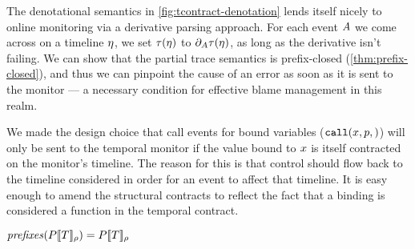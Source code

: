 The denotational semantics in \autoref{fig:tcontract-denotation} lends itself nicely to online monitoring via a derivative parsing approach.
%
For each event $A$ we come across on a timeline $\eta$, we set $\tau(\eta)$ to $\partial_{A}{\tau(\eta)}$, as long as the derivative isn't failing.
%
We can show that the partial trace semantics is prefix-closed (\autoref{thm:prefix-closed}), and thus we can pinpoint the cause of an error as soon as it is sent to the monitor --- a necessary condition for effective blame management in this realm.

We made the design choice that call events for bound variables ($\scallev{\mvar,\mvpat}$) will only be sent to the temporal monitor if the value bound to $x$ is itself contracted on the monitor's timeline.
%
The reason for this is that control should flow back to the timeline considered in order for an event to affect that timeline.
%
It is easy enough to amend the structural contracts to reflect the fact that a binding is considered a function in the temporal contract.

\begin{theorem}\label{thm:prefix-closed}
  $\mathit{prefixes}(P[\![ T ]\!]_{\rho}) = P[\![ T ]\!]_{\rho}$
\end{theorem}

